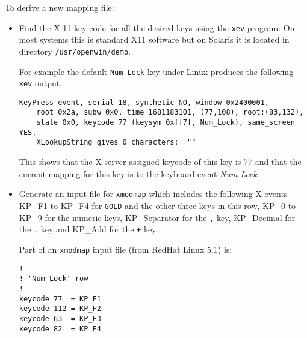 \documentclass[twoside,11pt]{article}
\begin{document}
To derive a new mapping file:
\begin{itemize}

\item Find the X-11 key-code for all the desired keys using the \texttt{xev}
program. On most systems this is standard X11 software but on Solaris
it is located in directory \texttt{/usr/openwin/demo}.

For example the default \texttt{Num Lock} key under Linux produces the
following \texttt{xev} output.
\begin{verbatim}
KeyPress event, serial 18, synthetic NO, window 0x2400001,
    root 0x2a, subw 0x0, time 1681183101, (77,108), root:(83,132),
    state 0x0, keycode 77 (keysym 0xff7f, Num_Lock), same_screen YES,
    XLookupString gives 0 characters:  ""
\end{verbatim}

This shows that the X-server assigned keycode of this key is 77 and that the
current mapping for this key is to the keyboard event \textit{Num Lock}.

\item Generate an input file for \texttt{xmodmap} which includes the following
X-events -- KP\_F1 to KP\_F4 for \texttt{GOLD} and the other three keys in
this row, KP\_0 to KP\_9 for the numeric keys, KP\_Separator for the
\texttt{,} key,
KP\_Decimal for the \texttt{.} key and KP\_Add for the \texttt{+} key.

Part of an \texttt{xmodmap} input file (from RedHat Linux 5.1) is:
\begin{verbatim}
!
! 'Num Lock' row
!
keycode 77  = KP_F1
keycode 112 = KP_F2
keycode 63  = KP_F3
keycode 82  = KP_F4
\end{verbatim}

\end{itemize}
\end{document}
